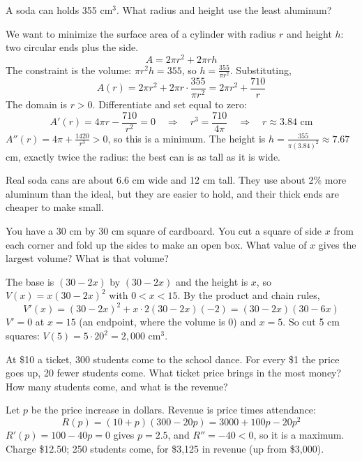 \begin{Worked}
\begin{Problem}
A soda can holds 355 cm$^3$. What radius and height use the least
aluminum?
\end{Problem}
\begin{Solution}
We want to minimize the surface area of a cylinder
with radius $r$ and height $h$: two circular ends plus the side.
$$A = 2\pi r^2 + 2\pi r h$$
The constraint is the volume: $\pi r^2 h = 355$, so $h = \frac{355}{\pi
r^2}$. Substituting,
$$A(r) = 2\pi r^2 + 2\pi r \cdot \frac{355}{\pi r^2} = 2\pi r^2 + \frac{710}{r}$$
The domain is $r > 0$. Differentiate and set equal to zero:
$$A'(r) = 4\pi r - \frac{710}{r^2} = 0 \quad\Rightarrow\quad r^3 = \frac{710}{4\pi} \quad\Rightarrow\quad r \approx 3.84 \text{ cm}$$
$A''(r) = 4\pi + \frac{1420}{r^3} > 0$, so this is a minimum. The height
is $h = \frac{355}{\pi (3.84)^2} \approx 7.67$ cm, exactly twice the radius:
the best can is as tall as it is wide.
\end{Solution}
\end{Worked}

Real soda cans are about 6.6 cm wide and 12 cm tall. They use about 2\%
more aluminum than the ideal, but they are easier to hold, and their
thick ends are cheaper to make small.

\begin{Exercise}[title={The Open Box}, label=optimization_box]
You have a 30 cm by 30 cm square of cardboard. You cut a square of side $x$
from each corner and fold up the sides to make an open box. What value of
$x$ gives the largest volume? What is that volume?
\end{Exercise}
\begin{Answer}[ref=optimization_box]
The base is $(30 - 2x)$ by $(30 - 2x)$ and the height is $x$, so
$V(x) = x(30 - 2x)^2$ with $0 < x < 15$. By the product and chain rules,
$$V'(x) = (30 - 2x)^2 + x \cdot 2(30 - 2x)(-2) = (30 - 2x)(30 - 6x)$$
$V' = 0$ at $x = 15$ (an endpoint, where the volume is 0) and $x = 5$. So
cut 5 cm squares: $V(5) = 5 \cdot 20^2 = 2{,}000$ cm$^3$.
\end{Answer}

\begin{Exercise}[title={The School Dance}, label=optimization_dance]
At \$10 a ticket, 300 students come to the school dance. For every \$1 the
price goes up, 20 fewer students come. What ticket price brings in the
most money? How many students come, and what is the revenue?
\end{Exercise}
\begin{Answer}[ref=optimization_dance]
Let $p$ be the price increase in dollars. Revenue is price times attendance:
$$R(p) = (10 + p)(300 - 20p) = 3000 + 100p - 20p^2$$
$R'(p) = 100 - 40p = 0$ gives $p = 2.5$, and $R'' = -40 < 0$, so it is a
maximum. Charge \$12.50; 250 students come, for \$3,125 in revenue (up
from \$3,000).
\end{Answer}

